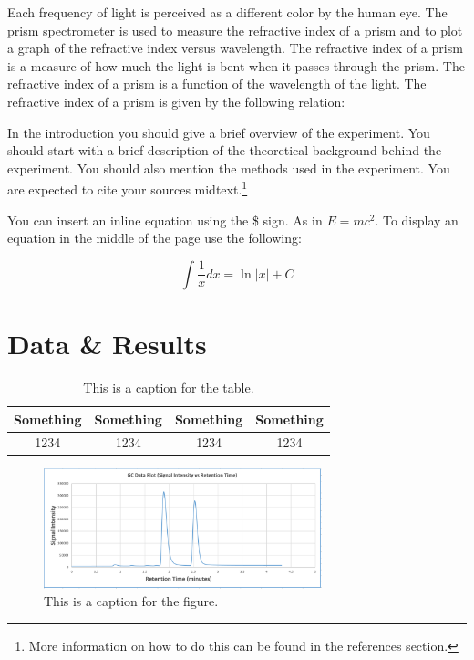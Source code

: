 \documentclass[10pt]{article}
\begin{document}
Each frequency of light is perceived as a different color by the human eye. The prism spectrometer is used to measure the refractive index of a prism and to plot a graph of the refractive index versus wavelength. The refractive index of a prism is a measure of how much the light is bent when it passes through the prism. The refractive index of a prism is a function of the wavelength of the light. The refractive index of a prism is given by the following relation:


In the introduction you should give a brief overview of the experiment. You should start with a brief description of the theoretical background behind the experiment. You should also mention the methods used in the experiment. You are expected to cite your sources\cite{Bravyi_2020} midtext.\footnote{More information on how to do this can be found in the references section.}


You can insert an inline equation using the \$ sign. As in $E=mc^2$. To display an equation in the middle of the page use the following:

\begin{equation}
    \int \frac{1}{x} dx = \ln|x| + C
\end{equation}

\section{Data \& Results}

\begin{table}[ht]
    \centering
    \begin{tabular}{|c|c|c|c|}
        \hline
        Something & Something & Something & Something \\
        \hline
        1234 & 1234 & 1234 & 1234 \\
        \hline
    \end{tabular}
    \caption{This is a caption for the table.}
    \label{tab:ex}
\end{table}

\begin{figure}[ht]
    \centering
    \includegraphics[width=0.72\textwidth]{example_figure.png}
    \caption{This is a caption for the figure.}
    \label{fig:ex}
\end{figure}
\end{document}
